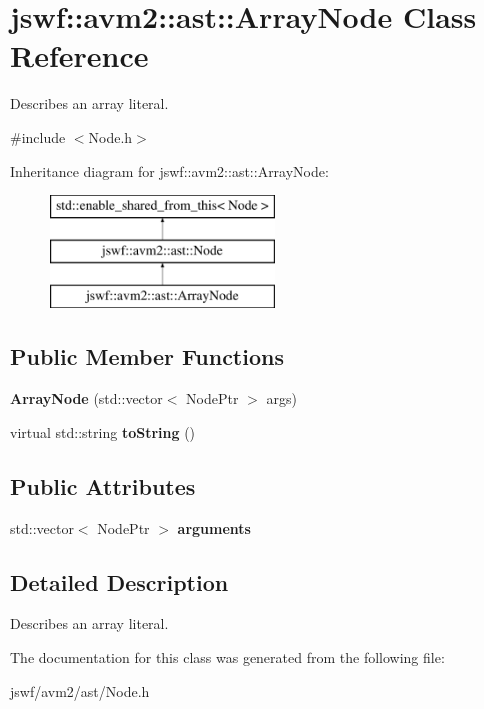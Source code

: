 \hypertarget{classjswf_1_1avm2_1_1ast_1_1_array_node}{\section{jswf\+:\+:avm2\+:\+:ast\+:\+:Array\+Node Class Reference}
\label{classjswf_1_1avm2_1_1ast_1_1_array_node}
}


Describes an array literal.  




{\ttfamily \#include $<$Node.\+h$>$}

Inheritance diagram for jswf\+:\+:avm2\+:\+:ast\+:\+:Array\+Node\+:\begin{figure}[H]
\begin{center}
\leavevmode
\includegraphics[height=3.000000cm]{classjswf_1_1avm2_1_1ast_1_1_array_node}
\end{center}
\end{figure}
\subsection*{Public Member Functions}
\begin{DoxyCompactItemize}
\item 
\hypertarget{classjswf_1_1avm2_1_1ast_1_1_array_node_a79b8767a5b409ada8c80836832b3c28e}{{\bfseries Array\+Node} (std\+::vector$<$ Node\+Ptr $>$ args)}\label{classjswf_1_1avm2_1_1ast_1_1_array_node_a79b8767a5b409ada8c80836832b3c28e}

\item 
\hypertarget{classjswf_1_1avm2_1_1ast_1_1_array_node_aa4e2db608958ce117252583675e5b950}{virtual std\+::string {\bfseries to\+String} ()}\label{classjswf_1_1avm2_1_1ast_1_1_array_node_aa4e2db608958ce117252583675e5b950}

\end{DoxyCompactItemize}
\subsection*{Public Attributes}
\begin{DoxyCompactItemize}
\item 
\hypertarget{classjswf_1_1avm2_1_1ast_1_1_array_node_a4125e463724e470c2b35db90abfbbe25}{std\+::vector$<$ Node\+Ptr $>$ {\bfseries arguments}}\label{classjswf_1_1avm2_1_1ast_1_1_array_node_a4125e463724e470c2b35db90abfbbe25}

\end{DoxyCompactItemize}


\subsection{Detailed Description}
Describes an array literal. 

The documentation for this class was generated from the following file\+:\begin{DoxyCompactItemize}
\item 
jswf/avm2/ast/Node.\+h\end{DoxyCompactItemize}
